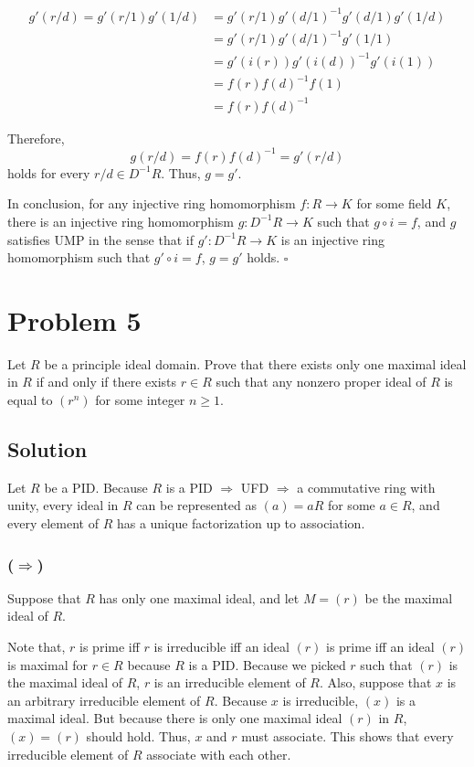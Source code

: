 \documentclass{article}
\newcommand{\qedsq}{\hfill$\square$}
\begin{document}
\begin{align*}
  g'(r/d) = g'(r/1) g'(1/d)
  &= g'(r/1) g'(d/1)^{-1} g'(d/1) g'(1/d)
  \\&= g'(r/1) g'(d/1)^{-1} g'(1/1)
  \\&= g'(i(r)) g'(i(d))^{-1} g'(i(1))
  \\&= f(r) f(d)^{-1} f(1)
  \\&= f(r) f(d)^{-1}
\end{align*}

Therefore,
\[g(r/d) = f(r) f(d)^{-1} = g'(r/d)\]
holds for every \(r/d \in D^{-1}R\). Thus, \(g = g'\).
\newline

\noindent
In conclusion, for any injective ring homomorphism \(f: R \to K\) for some field \(K\), there is an injective ring homomorphism \(g: D^{-1}R \to K\) such that \(g \circ i = f\), and \(g\) satisfies UMP in the sense that if \(g': D^{-1}R \to K\) is an injective ring homomorphism such that \(g' \circ i = f\), \(g = g'\) holds.
\qedsq

\newpage
\section*{Problem 5}
Let \(R\) be a principle ideal domain. Prove that there exists only one maximal ideal in \(R\) if and only if there exists \(r \in R\) such that any nonzero proper ideal of \(R\) is equal to \(\left(r^n\right)\) for some integer \(n \ge 1\).

\subsection*{Solution}

Let \(R\) be a PID. Because \(R\) is a PID \(\Rightarrow\) UFD \(\Rightarrow\) a commutative ring with unity, every ideal in \(R\) can be represented as \((a) = aR\) for some \(a \in R\), and every element of \(R\) has a unique factorization up to association.

\subsubsection*{(\(\Longrightarrow\))}

Suppose that \(R\) has only one maximal ideal, and let \(M = (r)\) be the maximal ideal of \(R\).

Note that, \(r\) is prime iff \(r\) is irreducible iff an ideal \((r)\) is prime iff an ideal \((r)\) is maximal for \(r \in R\) because \(R\) is a PID.
Because we picked \(r\) such that \((r)\) is the maximal ideal of \(R\),
\(r\) is an irreducible element of \(R\).
Also, suppose that \(x\) is an arbitrary irreducible element of \(R\).
Because \(x\) is irreducible, \((x)\) is a maximal ideal.
But because there is only one maximal ideal \((r)\) in \(R\),
\((x) = (r)\) should hold.
Thus, \(x\) and \(r\) must associate.
This shows that every irreducible element of \(R\) associate with each other.
\end{document}
